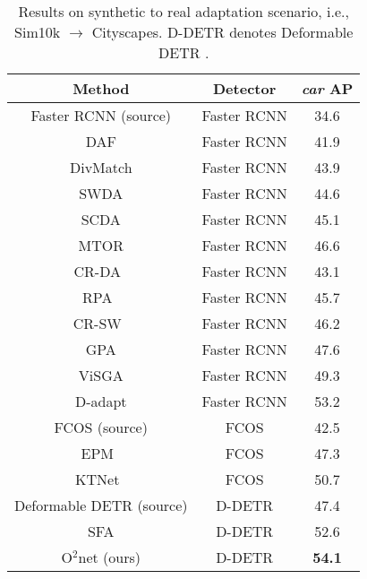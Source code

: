 \documentclass[sigconf]{acmart}
\begin{document}
 \begin{table}[t]
\centering
            \small
\caption{Results on synthetic to real adaptation scenario, i.e., Sim10k $\rightarrow$ Cityscapes. D-DETR denotes Deformable DETR \cite{zhu2020deformable}.} 
            \label{tab:sim10k}
            \setlength{\tabcolsep}{4mm}
            \begin{tabular}{c|c|c} 
                \toprule[1.0pt]
                Method & Detector & \emph{car} AP \\
                
                \hline
                Faster RCNN (source) & Faster RCNN & 34.6 \\
                DAF \cite{dafaster} & Faster RCNN & 41.9 \\
                DivMatch \cite{divmatch} & Faster RCNN & 43.9 \\
                SWDA \cite{strong-weak} & Faster RCNN & 44.6 \\
                SCDA \cite{scda} & Faster RCNN & 45.1 \\
                MTOR \cite{mtor} & Faster RCNN & 46.6 \\
                CR-DA~\cite{xu2020exploring} & Faster RCNN & 43.1 \\
                RPA~\cite{RPA} & Faster RCNN & 45.7 \\
                CR-SW~\cite{xu2020exploring} & Faster RCNN & 46.2 \\
                GPA  \cite{gpadet} & Faster RCNN & 47.6 \\
                ViSGA  \cite{ViSGA} & Faster RCNN & 49.3 \\
                D-adapt  \cite{jiang2021decoupled} & Faster RCNN & 53.2 \\
                \hline
                FCOS \cite{tian2019fcos} (source) & FCOS & 42.5 \\
                EPM~\cite{hsu2020every} & FCOS & 47.3 \\
                KTNet~\cite{KTNet} & FCOS & 50.7 \\
                \hline
                Deformable DETR (source) & D-DETR & 47.4  \\
                SFA \cite{wang2021exploring} & D-DETR & 52.6 \\
                O$^2$net (ours) & D-DETR & \textbf{54.1} \\
                \bottomrule[1.0pt]
            \end{tabular}


\end{table}
\end{document}
